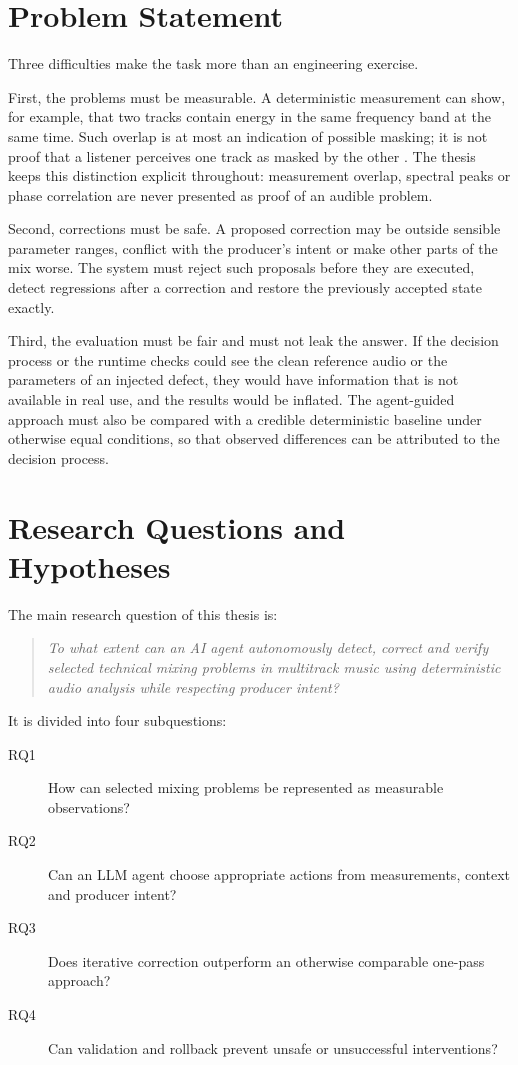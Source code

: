\section{Problem Statement}
\label{sec:intro-problem}

Three difficulties make the task more than an engineering exercise.

First, the problems must be measurable. A deterministic measurement can show, for example, that two tracks contain energy in the same frequency band at the same time. Such overlap is at most an indication of possible masking; it is not proof that a listener perceives one track as masked by the other \cite{Moore2012, Hafezi2015}. The thesis keeps this distinction explicit throughout: measurement overlap, spectral peaks or phase correlation are never presented as proof of an audible problem.

Second, corrections must be safe. A proposed correction may be outside sensible parameter ranges, conflict with the producer's intent or make other parts of the mix worse. The system must reject such proposals before they are executed, detect regressions after a correction and restore the previously accepted state exactly.

Third, the evaluation must be fair and must not leak the answer. If the decision process or the runtime checks could see the clean reference audio or the parameters of an injected defect, they would have information that is not available in real use, and the results would be inflated. The agent-guided approach must also be compared with a credible deterministic baseline under otherwise equal conditions, so that observed differences can be attributed to the decision process.

\section{Research Questions and Hypotheses}
\label{sec:intro-rq}

The main research question of this thesis is:

\begin{quote}
\textit{To what extent can an AI agent autonomously detect, correct and verify selected technical mixing problems in multitrack music using deterministic audio analysis while respecting producer intent?}
\end{quote}

It is divided into four subquestions:

\begin{description}
	\item[RQ1] How can selected mixing problems be represented as measurable observations?
	\item[RQ2] Can an \ac{LLM} agent choose appropriate actions from measurements, context and producer intent?
	\item[RQ3] Does iterative correction outperform an otherwise comparable one-pass approach?
	\item[RQ4] Can validation and rollback prevent unsafe or unsuccessful interventions?
\end{description}

